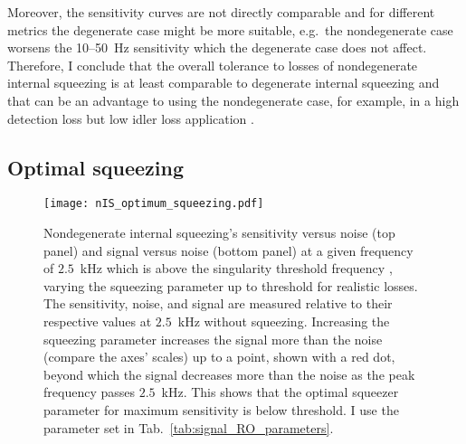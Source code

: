 Moreover, the sensitivity curves are not directly comparable and for different metrics the degenerate case might be more suitable, e.g.\ the nondegenerate case worsens the 10--50~Hz sensitivity which the degenerate case does not affect. %
Therefore, I conclude that the overall tolerance to losses of nondegenerate internal squeezing is at least comparable to degenerate internal squeezing and that can be an advantage to using the nondegenerate case, for example, in a high detection loss but low idler loss application . 


\subsection{Optimal squeezing}
\label{sec:nIS_optimal_squeezing}

\begin{figure}
	\centering
	\texttt{[image: nIS\_optimum\_squeezing.pdf]}
	\caption{  Nondegenerate internal squeezing's sensitivity versus noise (top panel) and signal versus noise (bottom panel) at a given frequency of $2.5$~kHz which is above the singularity threshold frequency , varying the squeezing parameter up to threshold for realistic losses. The sensitivity, noise, and signal are measured relative to their respective values at $2.5$~kHz without squeezing. Increasing the squeezing parameter increases the signal more than the noise (compare the axes' scales) up to a point, shown with a red dot, beyond which the signal decreases more than the noise as the peak frequency passes $2.5$~kHz. This shows that the optimal squeezer parameter  for maximum sensitivity is below threshold. I use the parameter set in Tab.~\ref{tab:signal_RO_parameters}.
    }
	\label{fig:nIS_optimum_squeezing}
\end{figure}


